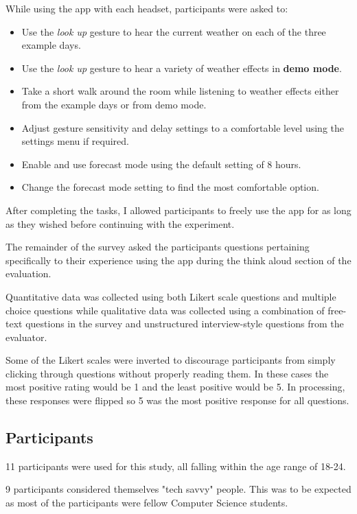\documentclass{l4proj}
\begin{document}
While using the app with each headset, participants were asked to: \begin{itemize}
    \item Use the \textit{look up} gesture to hear the current weather on each of the three example days.
    \item Use the \textit{look up} gesture to hear a variety of weather effects in \textbf{demo mode}.
    \item Take a short walk around the room while listening to weather effects either from the example days or from demo mode.
    \item Adjust gesture sensitivity and delay settings to a comfortable level using the settings menu if required.
    \item Enable and use forecast mode using the default setting of 8 hours.
    \item Change the forecast mode setting to find the most comfortable option.
\end{itemize}

After completing the tasks, I allowed participants to freely use the app for as long as they wished before continuing with the experiment.

The remainder of the survey asked the participants questions pertaining specifically to their experience using the app during the think aloud section of the evaluation.

Quantitative data was collected using both Likert scale questions and multiple choice questions while qualitative data was collected using a combination of free-text questions in the survey and unstructured interview-style questions from the evaluator.

Some of the Likert scales were inverted to discourage participants from simply clicking through questions without properly reading them. In these cases the most positive rating would be 1 and the least positive would be 5. In processing, these responses were flipped so 5 was the most positive response for all questions.

\subsection{Participants}
11 participants were used for this study, all falling within the age range of 18-24. 

9 participants considered themselves "tech savvy" people. This was to be expected as most of the participants were fellow Computer Science students.
\end{document}

